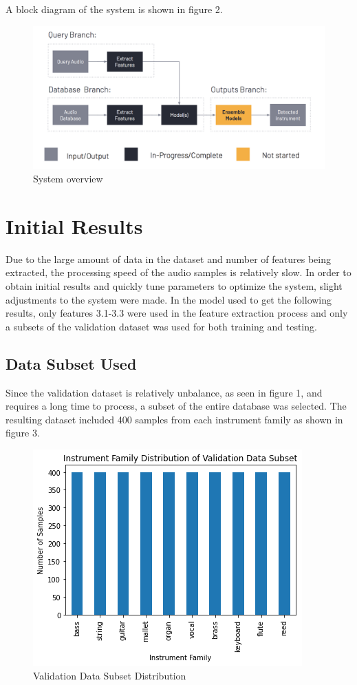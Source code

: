 \documentclass{article}
\begin{document}
A block diagram of the system is shown in figure 2.

\begin{figure}[htb]
  \centering
  \includegraphics[width=1\linewidth]{system}
  \caption{System overview}
\end{figure}

\section{Initial Results}
\label{Results}

Due to the large amount of data in the dataset and number of features being extracted, the processing speed of the audio samples is relatively slow. In order to obtain initial results and quickly tune parameters to optimize the system, slight adjustments to the system were made. In the model used to get the following results, only features 3.1-3.3 were used in the feature extraction process and only a subsets of the validation dataset was used for both training and testing.

\subsection{Data Subset Used}
Since the validation dataset is relatively unbalance, as seen in figure 1, and requires a long time to process, a subset of the entire database was selected. The resulting dataset included 400 samples from each instrument family as shown in figure 3.

\begin{figure}[htb]
  \centering
  \includegraphics[width=.5\linewidth]{validation_subset}
  \caption{Validation Data Subset Distribution}
\end{figure}
\end{document}
